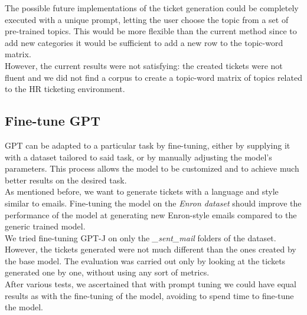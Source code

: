 The possible future implementations of the ticket generation could be completely executed with a unique prompt, letting the user choose the topic from a set of pre-trained topics. This would be more flexible than the current method since to add new categories it would be sufficient to add a new row to the topic-word matrix. \\
However, the current results were not satisfying: the created tickets were not fluent and we did not find a corpus to create a topic-word matrix of topics related to the HR ticketing environment.

\subsection{Fine-tune GPT}
GPT can be adapted to a particular task by fine-tuning, either by supplying it with a dataset tailored to said task, or by manually adjusting the model's parameters. This process allows the model to be customized and to achieve much better results on the desired task. \\
As mentioned before, we want to generate tickets with a language and style similar to emails. Fine-tuning the model on the \textit{Enron dataset} should improve the performance of the model at generating new Enron-style emails compared to the generic trained model. \\
We tried fine-tuning GPT-J on only the \textit{\_sent\_mail} folders of the dataset. However, the tickets generated were not much different than the ones created by the base model. The evaluation was carried out only by looking at the tickets generated one by one, without using any sort of metrics.\\
After various tests, we ascertained that with prompt tuning we could have equal results as with the fine-tuning of the model, avoiding to spend time to fine-tune the model.